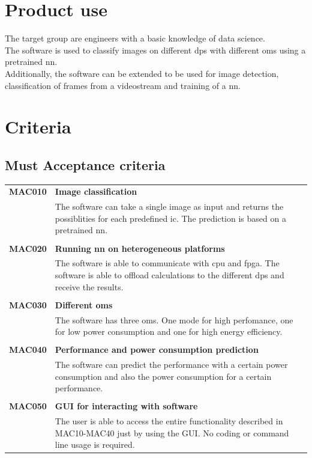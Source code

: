 \documentclass[parskip=full]{scrartcl}
\begin{document}
\section{Product use}
The target group are engineers with a basic knowledge of data science.\\
The software is used to classify images on different \glspl{dp} with different \glspl{om} using a pretrained \gls{nn}.\\
Additionally, the software can be extended to be used for image detection, classification of frames from a videostream and training of a \gls{nn}.


\section{Criteria}
\subsection{Must Acceptance criteria}
\begin{tabular}{p{2cm}p{11.4cm}}
\textbf{MAC010} & \textbf{Image classification} \\
& The software can take a single image as input and returns the possiblities for each predefined \gls{ic}. The prediction is based on a pretrained \gls{nn}.\\
& \\
\textbf{MAC020} & \textbf{Running \gls{nn} on heterogeneous platforms} \\
& The software is able to communicate with \gls{cpu} and \gls{fpga}. The software is able to offload calculations to the different \glspl{dp} and receive the results.\\
& \\
\textbf{MAC030} & \textbf{Different \glspl{om}} \\
& The software has three \glspl{om}. One mode for high perfomance, one for low \gls{power consumption} and one for high energy efficiency. \\
& \\
\textbf{MAC040} & \textbf{Performance and \gls{power consumption} prediction}\\
& The software can predict the \gls{performance} with a certain \gls{power consumption} and also the \gls{power consumption} for a certain \gls{performance}.\\
& \\
\textbf{MAC050} & \textbf{GUI for interacting with software} \\
& The user is able to access the entire functionality described in MAC10-MAC40 just by using the GUI. No coding or command line usage is required.
\end{tabular}
\end{document}
